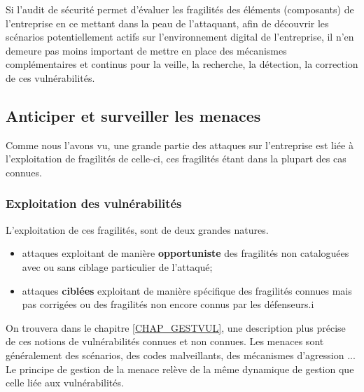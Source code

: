 Si l'audit de sécurité permet d'évaluer les fragilités des éléments (composants) de l'entreprise en ce mettant dans la peau de l'attaquant, afin de découvrir les scénarios potentiellement actifs sur l'environnement digital de l'entreprise, il n'en demeure pas moins important de mettre en place des mécanismes complémentaires et continus pour la veille, la recherche, la détection, la correction de ces vulnérabilités.


\subsection{Anticiper et surveiller les menaces }

Comme nous l'avons vu, une grande partie des attaques sur l'entreprise est liée à l'exploitation de fragilités de celle-ci, ces fragilités étant dans la plupart des cas connues.  

\begin{frame}
\frametitle<presentation>{Exploitation des vulnérabilités}
L'exploitation de ces fragilités, sont de deux grandes natures.
\begin{itemize}
	\item attaques exploitant de manière \textbf{opportuniste} des fragilités non cataloguées  avec ou sans ciblage particulier de l'attaqué;
	\item attaques \textbf{ciblées} exploitant de manière spécifique des fragilités connues mais pas corrigées ou des fragilités non encore connus par les défenseurs.i
\end{itemize}
\end{frame}

On trouvera dans le chapitre \ref{CHAP_GESTVUL}, une description plus précise de ces notions de vulnérabilités connues et non connues. Les menaces sont généralement des scénarios, des codes malveillants, des mécanismes d'agression ...
Le principe de gestion de la menace relève de la même dynamique de gestion que celle liée aux vulnérabilités. 


